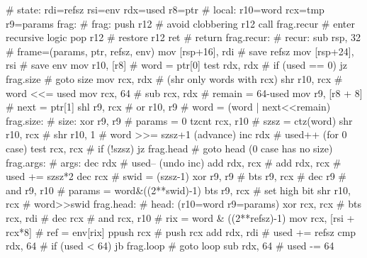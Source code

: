 \begin{asm}
# state: rdi=refsz rsi=env rdx=used r8=ptr
# local: r10=word rcx=tmp r9=params
frag:                                       # frag:
	push	r12                         #   avoid clobbering r12
	call	frag.recur                  #   enter recursive logic
	pop	r12                         #   restore r12
	ret                                 #   return
frag.recur:                                 # recur:
	sub	rsp, 32                     #   frame=(params, ptr, refsz, env)
	mov	[rsp+16], rdi               #   save refsz
	mov	[rsp+24], rsi               #   save env
	mov	r10, [r8]                   #   word = ptr[0]
	test	rdx, rdx                    #   if (used == 0)
	jz	frag.size                   #   goto size
	mov	rcx, rdx                    #   (shr only words with rcx)
	shr	r10, rcx                    #   word <<= used
	mov	rcx, 64                     #
	sub	rcx, rdx                    #   remain = 64-used
	mov	r9, [r8 + 8]                #   next = ptr[1]
	shl	r9, rcx                     #
	or	r10, r9                     #   word = (word | next<<remain)
frag.size:                                  # size:
	xor	r9, r9                      #   params = 0
	tzcnt	rcx, r10                    #   szsz = ctz(word)
	shr	r10, rcx                    #
	shr	r10, 1                      #   word >>= szsz+1 (advance)
	inc	rdx                         #   used++ (for 0 case)
	test	rcx, rcx                    #   if (!szsz)
	jz	frag.head                   #     goto head (0 case has no size)
frag.args:                                  # args:
	dec	rdx                         #   used-- (undo inc)
	add	rdx, rcx                    #
	add	rdx, rcx                    #   used += szsz*2
	dec	rcx                         #   swid = (szsz-1)
	xor	r9, r9                      #
	bts	r9, rcx                     #
	dec	r9                          #
	and	r9, r10                     #   params = word&((2**swid)-1)
	bts	r9, rcx                     #   set high bit
	shr	r10, rcx                    #   word>>swid
frag.head:                                  # head: (r10=word r9=params)
	xor	rcx, rcx                    #
	bts	rcx, rdi                    #
	dec	rcx                         #
	and	rcx, r10                    #   rix = word & ((2**refsz)-1)
	mov	rcx, [rsi + rcx*8]          #   ref = env[rix]
	ppush	rcx                         #   push rcx
	add	rdx, rdi                    #   used += refsz
	cmp	rdx, 64                     #   if (used < 64)
	jb	frag.loop                   #     goto loop
	sub	rdx, 64                     #   used -= 64

\end{asm}

